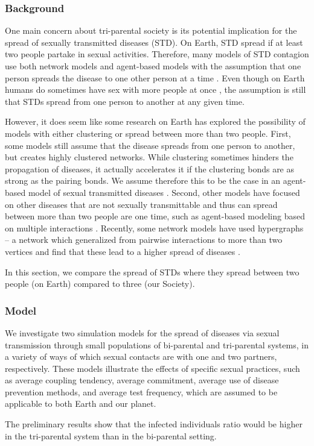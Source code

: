
\subsubsection{Background}

One main concern about tri-parental society is its potential implication for the spread of sexually transmitted diseases (STD). On Earth, STD spread if at least two people partake in sexual activities. Therefore, many models of STD contagion use both network models and agent-based models with the assumption that one person spreads the disease to one other person at a time \cite{Eames2002, Althouse2014}. Even though on Earth humans do sometimes have sex with more people at once , the assumption is still that STDs spread from one person to another at any given time. 

However, it does seem like some research on Earth has explored the possibility of models with either clustering or spread between more than two people. First, some models still assume that the disease spreads from one person to another, but creates highly clustered networks. While clustering sometimes hinders the propagation of diseases, it actually accelerates it if the clustering bonds are as strong as the pairing bonds. We assume therefore this to be the case in an agent-based model of sexual transmitted diseases \cite{Hebert-Dufresne2015}. Second, other models have focused on other diseases that are not sexually transmittable and thus can spread between more than two people are one time, such as agent-based modeling based on multiple interactions \cite{Claude2009}. Recently, some network models have used hypergraphs -- a network which generalized from pairwise interactions to more than two vertices and find that these lead to a higher spread of diseases \citet{Jhun2019, Bodo2016}. 

In this section, we compare the spread of STDs where they spread between two people (on Earth) compared to three (our Society). 

\subsubsection{Model}
We investigate two simulation models for the spread of diseases via sexual transmission through small populations of bi-parental and tri-parental systems, in a variety of ways of which sexual contacts are with one and two partners, respectively. These models illustrate the effects of specific sexual practices, such as average coupling tendency, average commitment, average use of disease prevention methods, and average test frequency, which are assumed to be applicable to both Earth \cite{Doherty2005} and our planet.

The preliminary results show that the infected individuals ratio would be higher in the tri-parental system than in the bi-parental setting.


